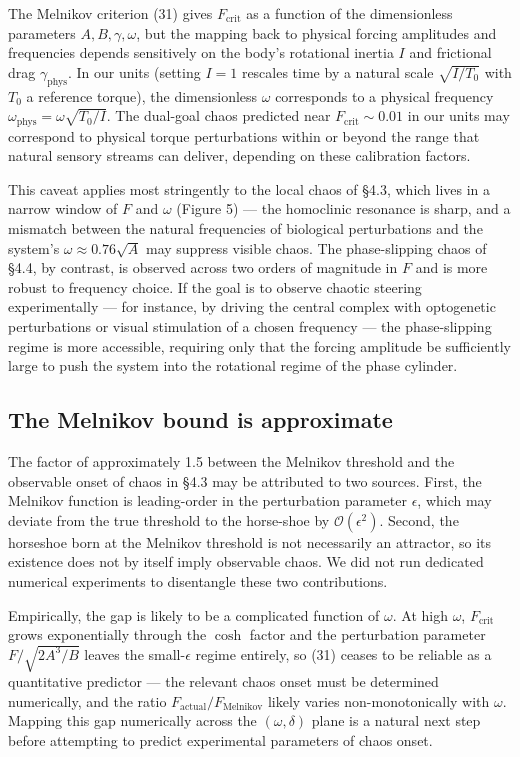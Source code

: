 \documentclass[11pt]{article}
\begin{document}
The Melnikov criterion (31) gives $F_{\text{crit}}$ as a function of the dimensionless parameters $A, B, \gamma, \omega$, but the mapping back to physical forcing amplitudes and frequencies depends sensitively on the body's rotational inertia $I$ and frictional drag $\gamma_{\text{phys}}$. In our units (setting $I = 1$ rescales time by a natural scale $\sqrt{I/T_0}$ with $T_0$ a reference torque), the dimensionless $\omega$ corresponds to a physical frequency $\omega_{\text{phys}} = \omega\sqrt{T_0/I}$. The dual-goal chaos predicted near $F_{\text{crit}} \sim 0.01$ in our units may correspond to physical torque perturbations within or beyond the range that natural sensory streams can deliver, depending on these calibration factors.

This caveat applies most stringently to the local chaos of §4.3, which lives in a narrow window of $F$ and $\omega$ (Figure 5) --- the homoclinic resonance is sharp, and a mismatch between the natural frequencies of biological perturbations and the system's $\omega \approx 0.76\sqrt{A}$ may suppress visible chaos. The phase-slipping chaos of §4.4, by contrast, is observed across two orders of magnitude in $F$ and is more robust to frequency choice. If the goal is to observe chaotic steering experimentally --- for instance, by driving the central complex with optogenetic perturbations or visual stimulation of a chosen frequency --- the phase-slipping regime is more accessible, requiring only that the forcing amplitude be sufficiently large to push the system into the rotational regime of the phase cylinder.

\subsection{The Melnikov bound is approximate}

The factor of approximately 1.5 between the Melnikov threshold and the observable onset of chaos in §4.3 may be attributed to two sources. First, the Melnikov function is leading-order in the perturbation parameter $\epsilon$, which may deviate from the true threshold to the horse-shoe by $\mathcal{O}(\epsilon^{2})$. Second, the horseshoe born at the Melnikov threshold is not necessarily an attractor, so its existence does not by itself imply observable chaos. We did not run dedicated numerical experiments to disentangle these two contributions.

Empirically, the gap is likely to be a complicated function of $\omega$. At high $\omega$, $F_{\text{crit}}$ grows exponentially through the $\cosh$ factor and the perturbation parameter $F/\sqrt{2A^3/B}$ leaves the small-$\epsilon$ regime entirely, so (31) ceases to be reliable as a quantitative predictor --- the relevant chaos onset must be determined numerically, and the ratio $F_{\text{actual}}/F_{\text{Melnikov}}$ likely varies non-monotonically with $\omega$. Mapping this gap numerically across the $(\omega, \delta)$ plane is a natural next step before attempting to predict experimental parameters of chaos onset.
\end{document}
